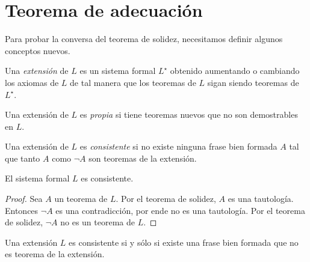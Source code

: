 \chapter{Teorema de adecuación}

\begin{preliminaries}
Para probar la conversa del teorema de solidez, necesitamos definir algunos conceptos nuevos.
\end{preliminaries}

\begin{definition}
Una \textit{extensión} de $L$ es un sistema formal $L^\star$ obtenido aumentando o cambiando los axiomas de $L$ de tal manera que los teoremas de $L$ sigan siendo teoremas de $L^\star$.
\end{definition}

\begin{definition}
Una extensión de $L$ es \textit{propia} si tiene teoremas nuevos que no son demostrables en $L$.
\end{definition}

\begin{definition}
Una extensión de $L$ es \textit{consistente} si no existe ninguna frase bien formada $A$ tal que tanto $A$ como $\neg A$ son teoremas de la extensión.
\end{definition}

\begin{proposition}
El sistema formal $L$ es consistente.
\end{proposition}

\begin{proof}
Sea $A$ un teorema de $L$. Por el teorema de solidez, $A$ es una tautología. Entonces $\neg A$ es una contradicción, por ende no es una tautología. Por el teorema de solidez, $\neg A$ no es un teorema de $L$.
\end{proof}

\begin{proposition}
Una extensión $L$ es consistente si y sólo si existe una frase bien formada que no es teorema de la extensión.
\end{proposition}

